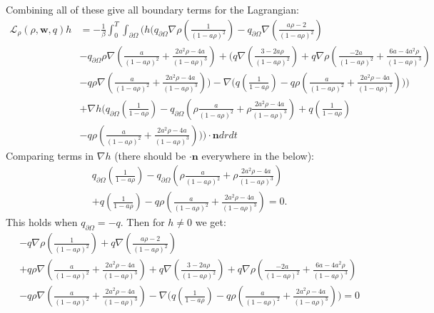 \documentclass[11pt, a4paper]{article}
\theoremstyle{definition}
\newcommand{\w}{\mathbf{w}}
\newcommand{\n}{\mathbf{n}}
\begin{document}
Combining all of these give all boundary terms for the Lagrangian:
\begin{align*}
	\mathcal{L}_\rho (\rho,\w,q)h &= - \frac{1}{\beta}\int_0^T \int_{\partial \Omega} \bigg( h \bigg(  q_{\partial \Omega}\nabla \rho \left( \frac{1}{(1 -a \rho)^2} \right)- q_{\partial \Omega} \nabla \left(\frac{a \rho  - 2}{(1- a \rho)^2}\right) \\
	&-  q_{\partial \Omega}\rho \nabla \left( \frac{a}{(1- a \rho)^2} + \frac{2a^2\rho - 4a}{(1- a \rho)^3} \right)
	+ \bigg( q  \nabla \left( \frac{3-2a\rho}{(1-a\rho)^2} \right) + q \nabla \rho  \left( \frac{-2a }{(1-a\rho)^2} + \frac{6a-4a^2  \rho}{(1-a\rho)^3}  \right)\\
	&- q\rho \nabla \left(\frac{a }{(1-a\rho)^2} + \frac{2a^2\rho -4a}{(1-a\rho)^3} \right) \bigg) -  \nabla \bigg(q \left(\frac{1}{1- a\rho} \right)  - q\rho  \left(\frac{a }{(1-a\rho)^2} + \frac{2a^2\rho -4a}{(1-a\rho)^3} \right)  \bigg)	\bigg)\\
	& +\nabla h \bigg( q_{\partial \Omega} \left(\frac{1}{1 - a\rho}\right) - q_{\partial \Omega}\left( \rho \frac{a}{(1- a \rho)^2} + \rho\frac{2a^2\rho - 4a}{(1- a \rho)^3} \right) +q \left(\frac{1}{1- a\rho} \right) \\
	& - q\rho  \left(\frac{a }{(1-a\rho)^2} + \frac{2a^2\rho -4a}{(1-a\rho)^3} \right)  \bigg) \bigg) \cdot \n dr dt
\end{align*}
Comparing terms in $\nabla h$ (there should be $\cdot \n$ everywhere in the below):
\begin{align*}
	&q_{\partial \Omega} \left(\frac{1}{1 - a\rho}\right) - q_{\partial \Omega}\left( \rho \frac{a}{(1- a \rho)^2} + \rho\frac{2a^2\rho - 4a}{(1- a \rho)^3} \right) \\
	&+q \left(\frac{1}{1- a\rho} \right)  - q\rho  \left(\frac{a }{(1-a\rho)^2} + \frac{2a^2\rho -4a}{(1-a\rho)^3} \right)  = 0.
\end{align*}
This holds when $q_{\partial \Omega} = -q$.
Then for $h \neq 0$ we get:
\begin{align*}
	&-q\nabla \rho \left( \frac{1}{(1 -a \rho)^2} \right)+q \nabla \left(\frac{a \rho  - 2}{(1- a \rho)^2}\right) \\
	&+q\rho \nabla \left( \frac{a}{(1- a \rho)^2} + \frac{2a^2\rho - 4a}{(1- a \rho)^3} \right)
	+  q  \nabla \left( \frac{3-2a\rho}{(1-a\rho)^2} \right) + q \nabla \rho  \left( \frac{-2a }{(1-a\rho)^2} + \frac{6a-4a^2  \rho}{(1-a\rho)^3}  \right)\\
	&- q\rho \nabla \left(\frac{a }{(1-a\rho)^2} + \frac{2a^2\rho -4a}{(1-a\rho)^3} \right) -  \nabla \bigg(q \left(\frac{1}{1- a\rho} \right)  - q\rho  \left(\frac{a }{(1-a\rho)^2} + \frac{2a^2\rho -4a}{(1-a\rho)^3} \right) \bigg) = 0
\end{align*}
\end{document}
